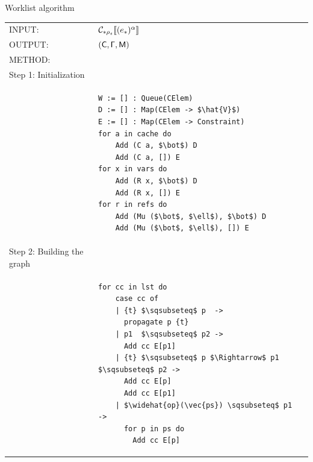 \documentclass[11pt]{beamer}
\begin{document}
\begin{frame}[fragile]{Worklist algorithm}
\begin{tiny}
\begin{tabular}{l l l}
INPUT: & $\mathcal{C}_{*\rho_s}\llbracket (e_*)^\alpha \rrbracket$\\
OUTPUT: & $(\mathsf{C}, \mathsf{\Gamma}, \mathsf{M})$\\
METHOD: &\\
Step 1: Initialization\\
&
\begin{lstlisting}[mathescape]
W := [] : Queue(CElem)
D := [] : Map(CElem -> $\hat{V}$)
E := [] : Map(CElem -> Constraint)
for a in cache do 
    Add (C a, $\bot$) D
    Add (C a, []) E
for x in vars do 
    Add (R x, $\bot$) D
    Add (R x, []) E
for r in refs do 
    Add (Mu ($\bot$, $\ell$), $\bot$) D
    Add (Mu ($\bot$, $\ell$), []) E
\end{lstlisting}\\
Step 2: Building the graph\\
&
\begin{lstlisting}[mathescape]
for cc in lst do
    case cc of
    | {t} $\sqsubseteq$ p  -> 
      propagate p {t}
    | p1  $\sqsubseteq$ p2 -> 
      Add cc E[p1]
    | {t} $\sqsubseteq$ p $\Rightarrow$ p1 $\sqsubseteq$ p2 -> 
      Add cc E[p]
      Add cc E[p1] 
    | $\widehat{op}(\vec{ps}) \sqsubseteq$ p1  -> 
      for p in ps do
        Add cc E[p]
\end{lstlisting}\\
\end{tabular}
\end{tiny}
\end{frame}
\end{document}
